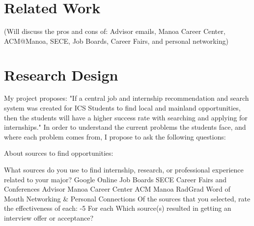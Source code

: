 \documentclass[english]{proposalnsf}
\begin{document}
	\section{Related Work}
	\label{relatedwork}
	(Will discuss the pros and cons of: Advisor emails, Manoa Career Center, ACM@Manoa, SECE, Job Boards, Career Fairs, and personal networking)


	\section{Research Design}
	\label{design}
	My project proposes: "If a central job and internship recommendation and search system was created for ICS Students to find local and mainland opportunities, then the students will have a higher success rate with searching and applying for internships." In order to understand the current problems the students face, and where each problem comes from, I propose to ask the following questions:
	
	About sources to find opportunities:
\begin{outline}
    \1 What sources do you use to find internship, research, or professional experience related to your major? 
        \2[\Square] Google
        \2[\Square] Online Job Boards
        \2[\Square] SECE
        \2[\Square] Career Fairs and Conferences
        \2[\Square] Advisor
        \2[\Square] Manoa Career Center
        \2[\Square] ACM Manoa
        \2[\Square] RadGrad
        \2[\Square] Word of Mouth
        \2[\Square] Networking & Personal Connections
    \1 Of the sources that you selected, rate the effectiveness of each:
        -5 For each
    \1 Which source(s) resulted in getting an interview offer or acceptance?
\end{outline}
\end{document}
